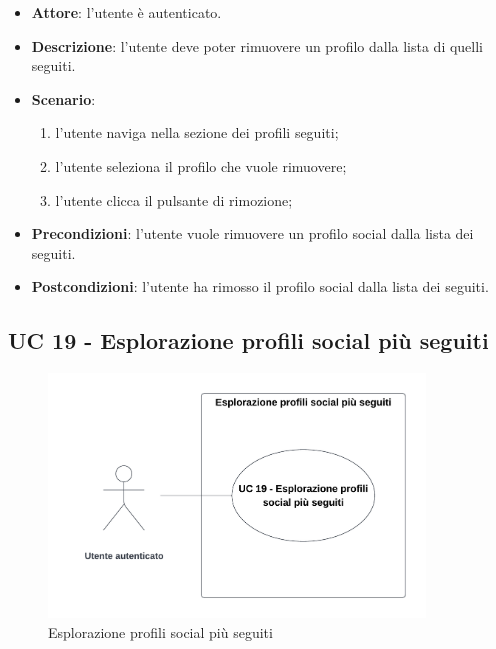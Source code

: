 \begin{itemize}
    \item \textbf{Attore}: l'utente è autenticato.
    \item \textbf{Descrizione}: l'utente deve poter rimuovere un profilo dalla lista di quelli seguiti.
    \item \textbf{Scenario}:
    \begin{enumerate}
        \item l'utente naviga nella sezione dei profili seguiti;
        \item l'utente seleziona il profilo che vuole rimuovere;
        \item l'utente clicca il pulsante di rimozione;
    \end{enumerate}

    \item \textbf{Precondizioni}: l'utente vuole rimuovere un profilo social dalla lista dei seguiti.
    \item \textbf{Postcondizioni}: l'utente ha rimosso il profilo social dalla lista dei seguiti.
\end{itemize}

\subsection{UC 19 - Esplorazione profili social più seguiti}

\begin{figure}[!h]
    \includegraphics[width=10cm]{sezioni/Images/UC19.png}
    \centering
    \caption{Esplorazione profili social più seguiti}
\end{figure}

